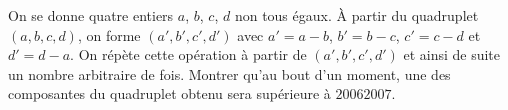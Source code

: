 On se donne quatre entiers $a$, $b$, $c$, $d$ non tous égaux. À partir du quadruplet $(a, b, c, d)$, on forme $(a', b', c', d')$ avec $a' = a - b$, $b' = b - c$, $c' = c - d$ et $d' = d - a$. On répète cette opération à partir de $(a', b', c', d')$ et ainsi de suite un nombre arbitraire de fois. Montrer qu'au bout d'un moment, une des composantes du quadruplet obtenu sera supérieure à $20062007$.
